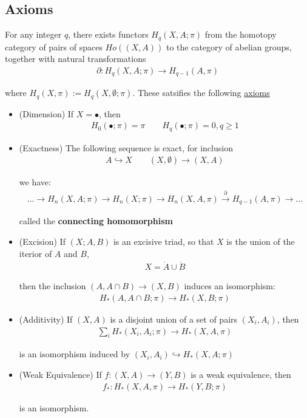 \documentclass[Total.tex]{subfiles}
\begin{document}
		\subsection{Axioms}
		\begin{theorem}
			For any integer $q$, there exists functors $H_q(X,A;\pi)$ from the homotopy category of pairs of spaces $Ho((X,A))$ to the category of abelian groups, together with natural transformations
			\begin{gather*}
				\partial:H_q(X,A;\pi)\rightarrow H_{q-1}(A,\pi)
			\end{gather*}
			
			where $H_q(X,\pi):=H_q(X,\emptyset;\pi)$. These satsifies the following \underline{axioms}
			
			\begin{itemize}
				\item (Dimension) If $X=\bullet$, then
				\begin{gather*}
					H_0(\bullet;\pi)=\pi\qquad H_q(\bullet;\pi)=0,q\geq 1
				\end{gather*}
				\item (Exactness) The following sequence is exact, for inclusion
				\begin{gather*}
					A\hookrightarrow X\qquad (X,\emptyset)\rightarrow (X,A)
				\end{gather*}
				
				we have:
				\begin{gather*}
					\dots\rightarrow H_n(X,A;\pi)\rightarrow H_n(X;\pi)\rightarrow H_n(X,A,\pi)\stackrel{\partial}{\rightarrow} H_{q-1}(A,\pi)\rightarrow\dots
 				\end{gather*}
				
				called the \textbf{connecting homomorphism}
				\item (Excision) If $(X;A,B)$ is an excisive triad, so that $X$ is the union of the iterior of $A$ and $B$,
				\begin{gather*}
					X=\dot{A}\cup \dot{B}
				\end{gather*}
				
				then the inclusion $(A,A\cap B)\rightarrow (X,B)$ induces an isomorphism:
				\begin{gather*}
					H_*(A,A\cap B;\pi)\rightarrow H_*(X,B;\pi)
				\end{gather*}
				\item (Additivity) If $(X,A)$ is a disjoint union of a set of pairs $(X_i,A_i)$, then
				\begin{gather*}
					\sum_i H_*(X_i,A_i;\pi)\rightarrow H_*(X,A,\pi)
				\end{gather*}
				
				is an isomorphism induced by $(X_i,A_i)\hookrightarrow H_*(X,A;\pi)$
				\item (Weak Equivalence) If $f:(X,A)\rightarrow (Y,B)$ is a weak equivalence, then
				\begin{gather*}
					f_*:H_*(X,A,\pi)\rightarrow H_*(Y,B;\pi)
				\end{gather*}
				
				is an isomorphism.
			\end{itemize}
		\end{theorem}
\end{document}
